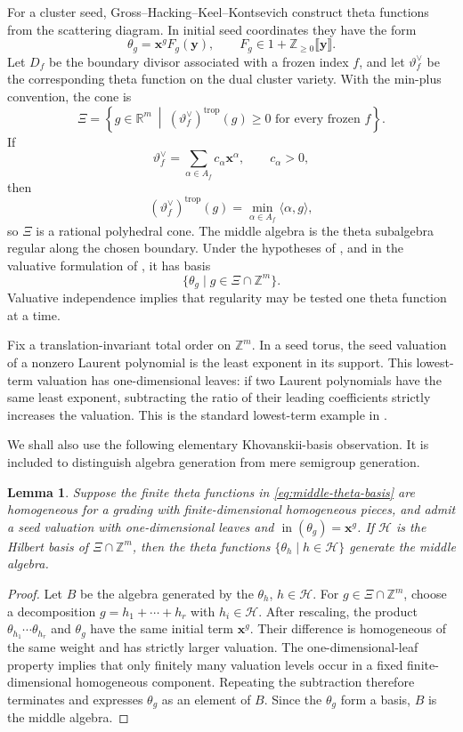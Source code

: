 \documentclass[11pt,reqno]{amsart}
\numberwithin{equation}{section}
\newtheorem{lemma}[lemma]{Lemma}
\theoremstyle{remark}
\newcommand{\ZZ}{\mathbb{Z}}
\newcommand{\RR}{\mathbb{R}}
\newcommand{\initer}{\operatorname{in}}
\begin{document}
For a cluster seed, Gross--Hacking--Keel--Kontsevich construct theta functions
from the scattering diagram.  In initial seed coordinates they have the form
\[ \theta_g=\mathbf{x}^gF_g(\mathbf{y}), \qquad F_g\in1+\ZZ_{\ge0}\llbracket\mathbf{y}\rrbracket. \]
Let $D_f$ be the boundary divisor associated with a frozen index $f$,
and let $\vartheta_f^\vee$ be the corresponding theta function on the dual
cluster variety.  With the min-plus convention, the cone is
\[ \Xi =\left\{g\in\RR^m\ \middle|\ (\vartheta_f^\vee)^{\mathrm{trop}}(g)\ge0 \text{ for every frozen }f\right\}. \]
If
\[ \vartheta_f^\vee=\sum_{\alpha\in A_f}c_\alpha\mathbf{x}^\alpha, \qquad c_\alpha>0, \]
then
\[ (\vartheta_f^\vee)^{\mathrm{trop}}(g) =\min_{\alpha\in A_f}\langle\alpha,g\rangle, \]
so $\Xi$ is a rational polyhedral cone.  The middle algebra is the theta
subalgebra regular along the chosen boundary.  Under the hypotheses of
\cite{GHKK}, and in the valuative formulation of \cite{CMMM}, it has basis
\begin{equation}
\label{eq:middle-theta-basis}
 \{\theta_g\mid g\in\Xi\cap\ZZ^m\}.
\end{equation}
Valuative independence implies that regularity may be tested one theta
function at a time.

Fix a translation-invariant total order on $\ZZ^m$.  In a seed torus, the
seed valuation of a nonzero Laurent polynomial is the least exponent in its
support.  This lowest-term valuation has one-dimensional leaves: if two
Laurent polynomials have the same least exponent, subtracting the ratio of
their leading coefficients strictly increases the valuation.  This is the
standard lowest-term example in \cite[Example~2.2(2)]{KM}.

We shall also use the following elementary Khovanskii-basis observation.  It
is included to distinguish algebra generation from mere semigroup
generation.

\begin{lemma}
\label{lem:hilbert-theta-generation}
Suppose the finite theta functions in \eqref{eq:middle-theta-basis} are
homogeneous for a grading with finite-dimensional homogeneous pieces, and
admit a seed valuation with one-dimensional leaves and
$\initer(\theta_g)=\mathbf{x}^g$.  If $\mathcal H$ is the Hilbert basis
of $\Xi\cap\ZZ^m$, then the theta functions
$\{\theta_h\mid h\in\mathcal H\}$ generate the middle algebra.
\end{lemma}

\begin{proof}
Let $B$ be the algebra generated by the $\theta_h$, $h\in\mathcal H$.
For $g\in\Xi\cap\ZZ^m$, choose a decomposition
$g=h_1+\cdots+h_r$ with $h_i\in\mathcal H$.  After rescaling, the product
$\theta_{h_1}\cdots\theta_{h_r}$ and $\theta_g$ have the same initial
term $\mathbf{x}^g$.  Their difference is homogeneous of the same weight
and has strictly larger valuation.  The one-dimensional-leaf property
implies that only finitely many valuation levels occur in a fixed
finite-dimensional homogeneous component.  Repeating the subtraction
therefore terminates and expresses $\theta_g$ as an element of $B$.
Since the $\theta_g$ form a basis, $B$ is the middle algebra.
\end{proof}
\end{document}
